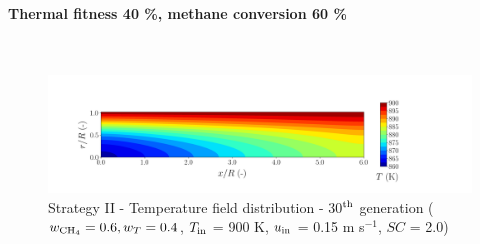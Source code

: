 \documentclass[preprint,12pt]{elsarticle}
\begin{document}


\clearpage



\paragraph{Thermal fitness 40 \%, methane conversion 60 \%} \hspace{0pt} \\
\noindent 


%

\begin{figure}[h!]
\centering
\includegraphics[width=190mm]{results/5Eq/60C_40T/GEN30-TFIELD.png}
\caption{\label{fig:5RES6040G30-TField} Strategy II - Temperature field distribution - 30$^{\rm{th}}$ generation ($w_{\rm{CH_4}} = 0.6, w_T = 0.4$, $T_{\rm{in}}$ = 900 K, $u_{\rm{in}}$ = 0.15 m s$^{-1}$, $SC$ = 2.0)}
\end{figure}
\end{document}
